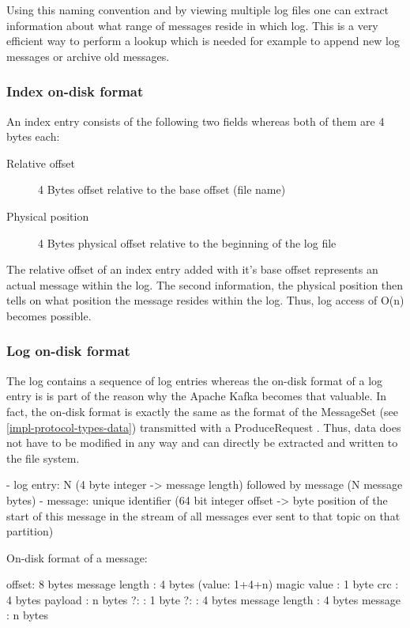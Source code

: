 Using this naming convention and by
viewing multiple log files one can extract information about what range of
messages reside in which log. This is a very efficient way to perform a lookup
which is needed for example to append new log messages or archive old messages.

\subsubsection{Index on-disk format}

An index entry consists of the following two fields whereas both of them are 4 bytes each:

\begin{description}
    \item[Relative offset] 4 Bytes offset relative to the base offset (file name)
    \item[Physical position] 4 Bytes physical offset relative to the beginning of the log file
\end{description}

The relative offset of an index entry added with it's base offset represents an
actual message within the log. The second information, the physical position then tells on what 
position the message resides within the log. Thus, log access of O(n) becomes possible.

\subsubsection{Log on-disk format}

The log contains a sequence of log entries whereas the on-disk format of a log
entry is is part of the reason why the Apache Kafka becomes that valuable. In
fact, the on-disk format is exactly the same as the format of the MessageSet
(see \ref{impl-protocol-types-data}) transmitted with a ProduceRequest
. Thus, data does not have to be
modified in any way and can directly be extracted and written to the file
system.

- log entry: N (4 byte integer -> message length) followed by message (N message bytes)
- message: unique identifier (64 bit integer offset -> byte position of the start of this message in the stream of all messages ever sent to that topic on that partition)

On-disk format of a message:

offset: 8 bytes
message length : 4 bytes (value: 1+4+n) 
magic value  : 1 byte
crc            : 4 bytes
payload        : n bytes
    ?:              : 1 byte
    ?:              : 4 bytes
    message length  : 4 bytes
    message         : n bytes

